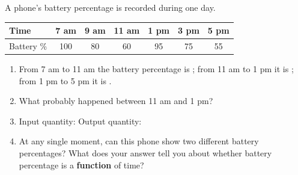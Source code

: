 \documentclass[10pt]{article}
\begin{document}
\vspace{0.1in}

\boxguard
\begin{tcolorbox}[colback=white, colframe=black!40,
    title=\textbf{Tier A --- Approaching Proficiency},
    fonttitle=\bfseries, arc=2mm, left=3mm, right=3mm, top=2mm, bottom=2mm]

A phone's battery percentage is recorded during one day.

\smallskip
\renewcommand{\arraystretch}{1.4}
\begin{tabular}{|l|c|c|c|c|c|c|}
\hline
Time & 7 am & 9 am & 11 am & 1 pm & 3 pm & 5 pm \\
\hline
Battery \% & 100 & 80 & 60 & 95 & 75 & 55 \\
\hline
\end{tabular}
\smallskip

\begin{enumerate}[itemsep=8pt]
  \item From 7 am to 11 am the battery percentage is \blank{2.8cm};
        from 11 am to 1 pm it is \blank{2.8cm};
        from 1 pm to 5 pm it is \blank{2.8cm}.

  \item What probably happened between 11 am and 1 pm?

        \vspace{0.05in}
        \writeline

  \item Input quantity: \blank{2.8cm} \quad Output quantity: \blank{3.2cm}

  \item At any single moment, can this phone show two different battery
        percentages? What does your answer tell you about whether battery
        percentage is a \textbf{function} of time?

        \vspace{0.05in}
\end{enumerate}
\end{tcolorbox}

\vspace{0.1in}
\end{document}
